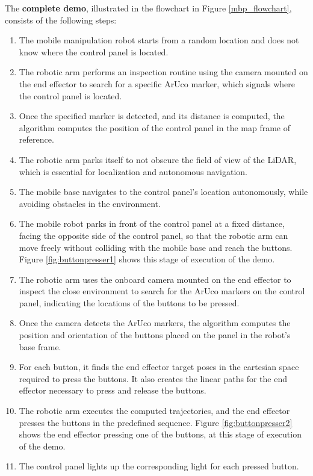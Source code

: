 The \textbf{complete demo}, illustrated in the flowchart in Figure \ref{mbp_flowchart}, consists of the following steps:
\begin{enumerate}
    \item The mobile manipulation robot starts from a random location and does not know 
    where the control panel is located.
    \item The robotic arm performs an inspection routine using the camera mounted on the end effector
    to search for a specific ArUco marker, which signals where the control panel is located.
    \item Once the specified marker is detected, and its distance is computed, the algorithm computes the
    position of the control panel in the map frame of reference.
    \item The robotic arm parks itself to not obscure the field of view of the LiDAR, which is essential for 
    localization and autonomous navigation.
    \item The mobile base navigates to the control panel's location autonomously, while avoiding obstacles in the
    environment.
    \item The mobile robot parks in front of the control panel at a fixed distance, facing the opposite side of the control panel,
    so that the robotic arm can move freely without colliding with the mobile base and reach the buttons.
    Figure \ref{fig:buttonpresser1} shows this stage of execution of the demo.
    \item The robotic arm uses the onboard camera mounted on the end effector to inspect the close environment
    to search for the ArUco markers on the control panel, indicating the locations of the buttons to be pressed.
    \item Once the camera detects the ArUco markers, the algorithm computes the position and orientation
    of the buttons placed on the panel in the robot's base frame.
    \item For each button, it finds the end effector target poses in the cartesian space required to press the buttons.
    It also creates the linear paths for the end effector necessary to press and release the buttons.
    \item The robotic arm executes the computed trajectories, and the end effector presses the buttons in the predefined sequence.
    Figure \ref{fig:buttonpresser2} shows the end effector pressing one of the buttons, at this stage of execution of the demo.
    \item The control panel lights up the corresponding light for each pressed button.
\end{enumerate}

